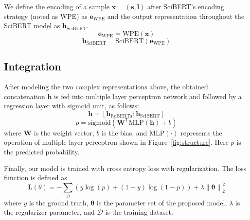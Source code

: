 We define the encoding of a sample $\bm{x}=(\bm{s},\bm{l})$ after SciBERT's encoding strategy (noted as WPE) as $\bm{e}_{\mathrm{WPE}}$ and the output representation throughout the SciBERT model as $\bm{h}_{\mathrm{SciBERT}}$.
\begin{equation}
    \bm{e}_{\mathrm{WPE}} = \bm{\mathrm{WPE}}(\bm{x})
\end{equation}
\begin{equation}
    \bm{h}_{\mathrm{SciBERT}} = \bm{\mathrm{SciBERT}}(\bm{e}_{\mathrm{WPE}})
\end{equation}

\subsection{Integration}
After modeling the two complex representations above, the obtained concatenation $\bm{h}$ is fed into multiple layer perceptron network and followed by a regression layer with $\mathrm{sigmoid}$ unit, as follows:
\begin{equation}
    \bm{h}=[\bm{h}_{\mathrm{RoBERTa}};\bm{h}_{\mathrm{SciBERT}}]
\end{equation}
\begin{equation}
p = \mathrm{sigmoid}(\bm{W}^\mathrm{T} \bm{\mathrm{MLP}}(\bm{h}) + b)
\end{equation}
where $\bm{W}$ is the weight vector, $b$ is the bias, and $\bm{\mathrm{MLP}}(\cdot)$ represents the operation of multiple layer perceptron shown in Figure~\ref{fig:structure}. Here $p$ is the predicted probability.

Finally, our model is trained with cross entropy loss with regularization. The loss function is defined as
\begin{equation}
\label{eq:loss}
\mathcal{\bm{L}}(\theta) = -\sum_{\mathcal{D}}{\left(y\log(p)+(1-y)\log(1-p)\right)} + \lambda{\|\bm{\theta}\|}_2^2
\end{equation}
where $y$ is the ground truth, $\bm{\theta}$ is the parameter set of the proposed model, $\lambda$ is the regularizer parameter, and $\mathcal{D}$ is the training dataset.